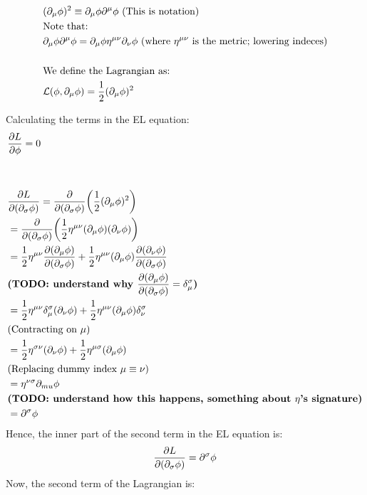 \begin{align*}
    &(\partial_\mu \phi)^2 \equiv \partial_\mu \phi \partial^\mu \phi~\text{(This is notation)} \\
    &\text{Note that:} \\
    &\partial_\mu \phi \partial^\mu \phi = \partial_\mu \phi \eta^{\mu \nu} \partial_\nu \phi 
    ~\text{(where $\eta^{\mu \nu}$ is the metric; lowering indeces)} \\
    \\
    &\text{We define the Lagrangian as:}\\
    &\mathcal{L}(\phi, \partial_\mu \phi) = \frac{1}{2}(\partial_\mu \phi)^2
\end{align*}

Calculating the terms in the EL equation:
\begin{align*}
    &\pdv{L}{\phi} = 0 \\
    \\
    \\
    &\pdv{L}{(\partial_\sigma \phi)} 
    = \pdv{(\partial_\sigma \phi)} \bigg( \frac{1}{2}(\partial_\mu \phi)^2  \bigg) \\
    &=\pdv{(\partial_\sigma \phi)}  \bigg( \frac{1}{2}\eta^{\mu \nu} (\partial_\mu \phi) (\partial_\nu \phi) \bigg) \\
    &=\frac{1}{2}\eta^{\mu \nu} \pdv{(\partial_\mu \phi)}{(\partial_\sigma \phi)} (\partial_\nu \phi) + 
    \frac{1}{2}\eta^{\mu \nu} (\partial_\mu \phi) \pdv{(\partial_\nu \phi)}{(\partial_\sigma \phi)} \\
    &\textbf{(TODO: understand why $\pdv{(\partial_\mu \phi)}{(\partial_\sigma \phi)}  = \delta_{\mu}^\sigma$)}
    \\
    &=\frac{1}{2}\eta^{\mu \nu} \delta_{\mu}^{\sigma} (\partial_\nu \phi) + 
    \frac{1}{2}\eta^{\mu \nu} (\partial_\mu \phi) \delta_{\nu}^{\sigma} \\
    &\text{(Contracting on $\mu$)}\\
    &=\frac{1}{2}\eta^{\sigma \nu} (\partial_\nu \phi) + 
    \frac{1}{2}\eta^{\mu \sigma} (\partial_\mu \phi) \\
    &\text{(Replacing dummy index $\mu \equiv \nu$)} \\
    &=\eta^{\nu \sigma} \partial_{mu} \phi \\
    &\textbf{(TODO: understand how this happens, something about $\eta$'s signature)} \\
    &=\partial^\sigma \phi
    \\
\end{align*}
    Hence, the inner part of the second term in the EL equation is:
\begin{equation}
    \pdv{L}{(\partial_\sigma \phi)}  = \partial^\sigma \phi
\end{equation}
Now, the second term of the Lagrangian is:


